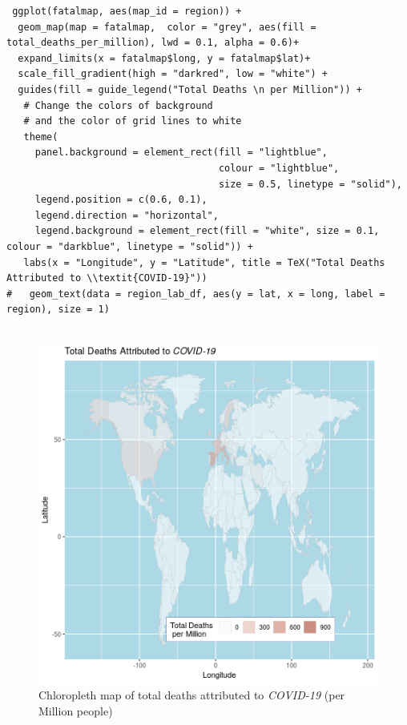 \documentclass[11pt]{article}
\begin{document}
\begin{listing}[htbp]
\begin{verbatim}
 ggplot(fatalmap, aes(map_id = region)) +
  geom_map(map = fatalmap,  color = "grey", aes(fill = total_deaths_per_million), lwd = 0.1, alpha = 0.6)+
  expand_limits(x = fatalmap$long, y = fatalmap$lat)+
  scale_fill_gradient(high = "darkred", low = "white") +
  guides(fill = guide_legend("Total Deaths \n per Million")) +
   # Change the colors of background
   # and the color of grid lines to white
   theme(
     panel.background = element_rect(fill = "lightblue",
                                     colour = "lightblue",
                                     size = 0.5, linetype = "solid"),
     legend.position = c(0.6, 0.1),
     legend.direction = "horizontal",
     legend.background = element_rect(fill = "white", size = 0.1, colour = "darkblue", linetype = "solid")) +
   labs(x = "Longitude", y = "Latitude", title = TeX("Total Deaths Attributed to \\textit{COVID-19}"))
#   geom_text(data = region_lab_df, aes(y = lat, x = long, label = region), size = 1)


\end{verbatim}
\caption{\label{orgbde88c8}use \texttt{ggplot2} to create a chloropleth map from data, output in figure \ref{fig:org7e64dfd}}
\end{listing}


\begin{figure}[htbp]
\centering
\includegraphics[width=.9\linewidth]{FirstChALL.png}
\caption{\label{fig:org7e64dfd}Chloropleth map of total deaths attributed to \emph{COVID-19} (per Million people)}
\end{figure}
\end{document}
